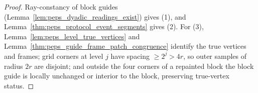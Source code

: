\begin{proof}\leanok
    Ray-constancy of block guides (Lemma~\ref{lem:peps_dyadic_readings_exist}) gives (1), and Lemma~\ref{thm:peps_protocol_event_segments} gives (2). For (3), Lemma~\ref{lem:peps_level_true_vertices} and Lemma~\ref{thm:peps_guide_frame_patch_congruence} identify the true vertices and frames; grid corners at level $j$ have spacing $\ge 2^j>4r$, so outer samples of radius $2r$ are disjoint; and outside the four corners of a repainted block the block guide is locally unchanged or interior to the block, preserving true-vertex status.
\end{proof}

